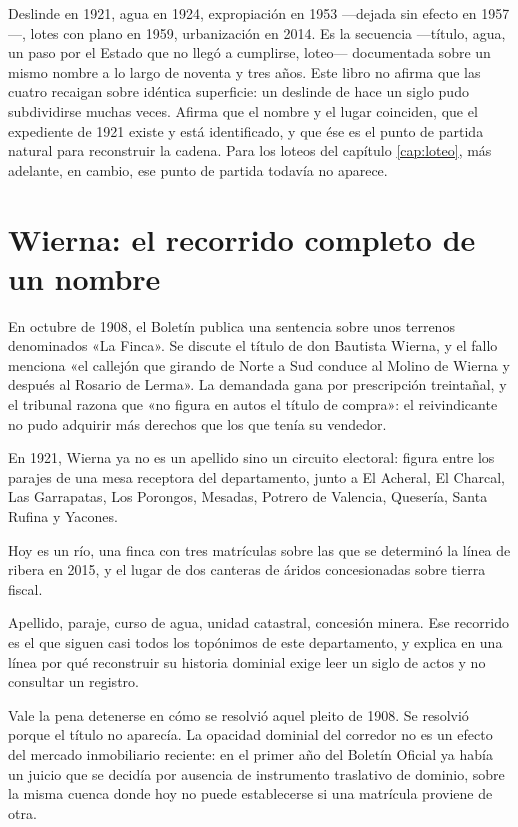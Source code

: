 Deslinde en 1921, agua en 1924, expropiación en 1953 ---dejada sin efecto en 1957---, lotes con plano en 1959, urbanización en 2014. Es la secuencia —título,
agua, un paso por el Estado que no llegó a cumplirse, loteo— documentada sobre un mismo nombre a lo largo de noventa y tres años. Este
libro no afirma que las cuatro recaigan sobre idéntica superficie: un deslinde de hace un
siglo pudo subdividirse muchas veces. Afirma que el nombre y el lugar coinciden, que el
expediente de 1921 existe y está identificado, y que ése es el punto de partida natural
para reconstruir la cadena. Para los loteos del capítulo \ref{cap:loteo}, más adelante, en cambio, ese punto de
partida todavía no aparece.

\section{Wierna: el recorrido completo de un nombre}

En octubre de 1908, el Boletín publica una sentencia sobre unos terrenos denominados «La
Finca». Se discute el título de don Bautista Wierna, y el fallo menciona «el callejón que
girando de Norte a Sud conduce al Molino de Wierna y después al Rosario de Lerma». La
demandada gana por prescripción treintañal, y el tribunal razona que «no figura en autos el
título de compra»: el reivindicante no pudo adquirir más derechos que los que tenía su
vendedor.

En 1921, Wierna ya no es un apellido sino un circuito electoral: figura entre los parajes
de una mesa receptora del departamento, junto a El Acheral, El Charcal, Las Garrapatas,
Los Porongos, Mesadas, Potrero de Valencia, Quesería, Santa Rufina y Yacones.

Hoy es un río, una finca con tres matrículas sobre las que se determinó la línea de ribera
en 2015, y el lugar de dos canteras de áridos concesionadas sobre tierra fiscal.

Apellido, paraje, curso de agua, unidad catastral, concesión minera. Ese recorrido es el
que siguen casi todos los topónimos de este departamento, y explica en una línea por qué
reconstruir su historia dominial exige leer un siglo de actos y no consultar un registro.

Vale la pena detenerse en cómo se resolvió aquel pleito de 1908. Se resolvió porque el
título no aparecía. La opacidad dominial del corredor no es un efecto del mercado
inmobiliario reciente: en el primer año del Boletín Oficial ya había un juicio que se
decidía por ausencia de instrumento traslativo de dominio, sobre la misma cuenca donde hoy
no puede establecerse si una matrícula proviene de otra.

